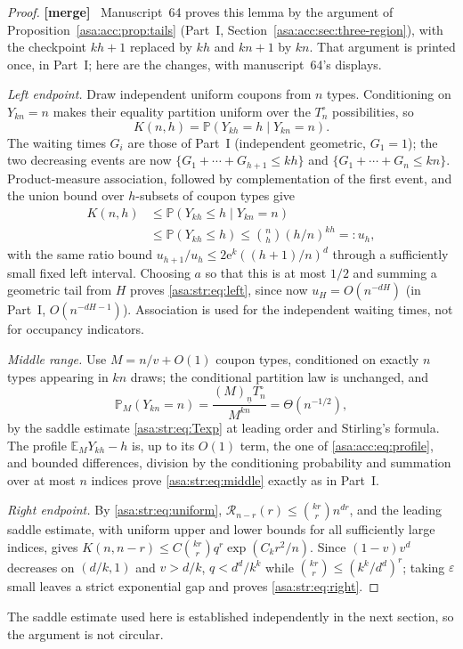 \documentclass[11pt,letterpaper]{article}
\theoremstyle{remark}\newtheorem{remark}[theorem]{Remark}
\numberwithin{equation}{section}
\newcommand{\E}{\mathbb E}\newcommand{\Prob}{\mathbb P}\newcommand{\Prb}{\mathbb P}
\newcommand{\ee}{\mathrm e}
\newenvironment{mergenote}{\par\smallskip\begingroup\small
 \noindent\textbf{[merge]}\ }{\par\endgroup\smallskip}
\begin{document}
\begin{proof}
\begin{mergenote}
Manuscript~64 proves this lemma by the argument of Proposition~\ref{asa:acc:prop:tails}
(Part~I, Section~\ref{asa:acc:sec:three-region}), with the checkpoint $kh+1$
replaced by $kh$ and $kn+1$ by $kn$. That argument is printed once, in Part~I;
here are the changes, with manuscript~64's displays.
\end{mergenote}
\emph{Left endpoint.} Draw independent uniform coupons from $n$ types.
Conditioning on $Y_{kn}=n$ makes their equality partition uniform over the
$T^{\circ}_n$ possibilities, so
\[
 K(n,h)=\Prb(Y_{kh}=h\mid Y_{kn}=n).
\]
The waiting times $G_i$ are those of Part~I (independent geometric, $G_1=1$);
the two decreasing events are now $\{G_1+\cdots+G_{h+1}\le kh\}$ and
$\{G_1+\cdots+G_n\le kn\}$. Product-measure association, followed by
complementation of the first event, and the union bound over $h$-subsets of
coupon types give
\begin{align*}
 K(n,h)&\le\Prb(Y_{kh}\le h\mid Y_{kn}=n)\\
 &\le\Prb(Y_{kh}\le h)
 \le\binom nh(h/n)^{kh}=:u_h ,
\end{align*}
with the same ratio bound $u_{h+1}/u_h\le2\ee^k((h+1)/n)^d$ through a
sufficiently small fixed left interval. Choosing $a$ so that this is at most
$1/2$ and summing a geometric tail from $H$ proves \eqref{asa:str:eq:left},
since now $u_H=O(n^{-dH})$ (in Part~I, $O(n^{-dH-1})$). Association is used
for the independent waiting times, not for occupancy indicators.

\emph{Middle range.} Use $M=n/v+O(1)$ coupon types, conditioned on exactly
$n$ types appearing in $kn$ draws; the conditional partition law is
unchanged, and
\[
 \Prb_M(Y_{kn}=n)=\frac{(M)_{\underline n}T^{\circ}_n}{M^{kn}}
 =\Theta(n^{-1/2}),
\]
by the saddle estimate \eqref{asa:str:eq:Texp} at leading order and
Stirling's formula. The profile $\E_M Y_{kh}-h$ is, up to its $O(1)$ term, the one of
\eqref{asa:acc:eq:profile}, and bounded differences, division by the
conditioning probability and summation over at most $n$ indices prove
\eqref{asa:str:eq:middle} exactly as in Part~I.

\emph{Right endpoint.} By \eqref{asa:str:eq:uniform},
$\mathcal R_{n-r}(r)\le\binom{kr}r n^{dr}$, and the leading saddle estimate,
with uniform upper and lower bounds for all sufficiently large indices,
gives $K(n,n-r)\le C\binom{kr}r q^r\exp(C_kr^2/n)$. Since $(1-v)v^d$
decreases on $(d/k,1)$ and $v>d/k$, $q<d^d/k^k$ while
$\binom{kr}r\le(k^k/d^d)^r$; taking $\varepsilon$ small leaves a strict
exponential gap and proves \eqref{asa:str:eq:right}.
\end{proof}
The saddle estimate used here is established independently in the next section, so the argument is not circular.
\end{document}
